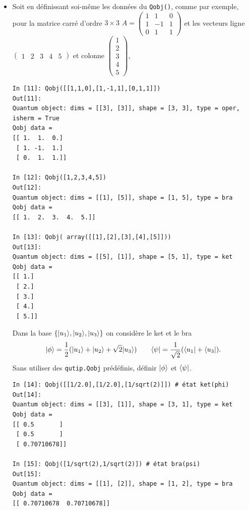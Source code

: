 \begin{itemize}
\item Soit en définissant soi-même les données du \texttt{Qobj()}, comme par 
exemple, pour la matrice carré d'ordre $3\times3$ $A =\begin{pmatrix}
1&1&0\\1&-1&1\\0&1&1\end{pmatrix}$ et les vecteurs ligne 
$\begin{pmatrix}1&2&3&4&5\end{pmatrix}$ et colonne 
$\begin{pmatrix}1\\2\\3\\4\\5\end{pmatrix}$,
\begin{lstlisting}
In [11]: Qobj([[1,1,0],[1,-1,1],[0,1,1]])
Out[11]: 
Quantum object: dims = [[3], [3]], shape = [3, 3], type = oper, isherm = True
Qobj data =
[[ 1.  1.  0.]
 [ 1. -1.  1.]
 [ 0.  1.  1.]]

In [12]: Qobj([1,2,3,4,5])
Out[12]: 
Quantum object: dims = [[1], [5]], shape = [1, 5], type = bra
Qobj data =
[[ 1.  2.  3.  4.  5.]]

In [13]: Qobj( array([[1],[2],[3],[4],[5]]))
Out[13]: 
Quantum object: dims = [[5], [1]], shape = [5, 1], type = ket
Qobj data =
[[ 1.]
 [ 2.]
 [ 3.]
 [ 4.]
 [ 5.]]
\end{lstlisting}

\begin{exercice}
Dans la base $\{\vert u_1\rangle,\vert u_2\rangle,\vert u_3\rangle\}$ on considère le ket et le bra 
\begin{equation}
\vert\phi\rangle=\dfrac{1}{2}(\vert u_1\rangle+\vert u_2\rangle+\sqrt{2}\vert u_3\rangle) \qquad 
\langle\psi\vert=\dfrac{1}{\sqrt{2}}(\langle u_1\vert+\langle u_3\vert).
\end{equation}
Sans utiliser des \texttt{qutip.Qobj} prédéfinis, définir $\vert\phi\rangle$ et 
$\langle\psi\vert$.
\end{exercice}

\begin{solution}
\begin{lstlisting}
In [14]: Qobj([[1/2.0],[1/2.0],[1/sqrt(2)]]) # état ket(phi)
Out[14]: 
Quantum object: dims = [[3], [1]], shape = [3, 1], type = ket
Qobj data =
[[ 0.5       ]
 [ 0.5       ]
 [ 0.70710678]]

In [15]: Qobj([1/sqrt(2),1/sqrt(2)]) # état bra(psi)
Out[15]: 
Quantum object: dims = [[1], [2]], shape = [1, 2], type = bra
Qobj data =
[[ 0.70710678  0.70710678]]
\end{lstlisting}
\end{solution}


\end{itemize}
